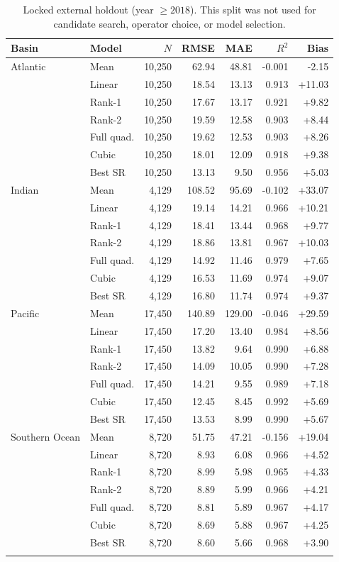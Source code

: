 \begin{table}[htbp]
\centering
\caption{Locked external holdout (year $\ge 2018$). This split was not used for candidate search, operator choice, or model selection.}
\label{tab:external}
\small
\begin{tabular}{llrrrrr}
\toprule
Basin & Model & $N$ & RMSE & MAE & $R^2$ & Bias \\
\midrule
Atlantic & Mean & 10,250 & 62.94 & 48.81 & -0.001 & -2.15 \\
 & Linear & 10,250 & 18.54 & 13.13 & 0.913 & +11.03 \\
 & Rank-1 & 10,250 & 17.67 & 13.17 & 0.921 & +9.82 \\
 & Rank-2 & 10,250 & 19.59 & 12.58 & 0.903 & +8.44 \\
 & Full quad. & 10,250 & 19.62 & 12.53 & 0.903 & +8.26 \\
 & Cubic & 10,250 & 18.01 & 12.09 & 0.918 & +9.38 \\
 & Best SR & 10,250 & 13.13 & 9.50 & 0.956 & +5.03 \\
\addlinespace
Indian & Mean & 4,129 & 108.52 & 95.69 & -0.102 & +33.07 \\
 & Linear & 4,129 & 19.14 & 14.21 & 0.966 & +10.21 \\
 & Rank-1 & 4,129 & 18.41 & 13.44 & 0.968 & +9.77 \\
 & Rank-2 & 4,129 & 18.86 & 13.81 & 0.967 & +10.03 \\
 & Full quad. & 4,129 & 14.92 & 11.46 & 0.979 & +7.65 \\
 & Cubic & 4,129 & 16.53 & 11.69 & 0.974 & +9.07 \\
 & Best SR & 4,129 & 16.80 & 11.74 & 0.974 & +9.37 \\
\addlinespace
Pacific & Mean & 17,450 & 140.89 & 129.00 & -0.046 & +29.59 \\
 & Linear & 17,450 & 17.20 & 13.40 & 0.984 & +8.56 \\
 & Rank-1 & 17,450 & 13.82 & 9.64 & 0.990 & +6.88 \\
 & Rank-2 & 17,450 & 14.09 & 10.05 & 0.990 & +7.28 \\
 & Full quad. & 17,450 & 14.21 & 9.55 & 0.989 & +7.18 \\
 & Cubic & 17,450 & 12.45 & 8.45 & 0.992 & +5.69 \\
 & Best SR & 17,450 & 13.53 & 8.99 & 0.990 & +5.67 \\
\addlinespace
Southern Ocean & Mean & 8,720 & 51.75 & 47.21 & -0.156 & +19.04 \\
 & Linear & 8,720 & 8.93 & 6.08 & 0.966 & +4.52 \\
 & Rank-1 & 8,720 & 8.99 & 5.98 & 0.965 & +4.33 \\
 & Rank-2 & 8,720 & 8.89 & 5.99 & 0.966 & +4.21 \\
 & Full quad. & 8,720 & 8.81 & 5.89 & 0.967 & +4.17 \\
 & Cubic & 8,720 & 8.69 & 5.88 & 0.967 & +4.25 \\
 & Best SR & 8,720 & 8.60 & 5.66 & 0.968 & +3.90 \\
\addlinespace
\bottomrule
\end{tabular}
\end{table}
